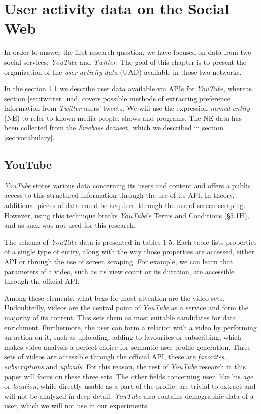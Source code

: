 \section{User activity data on the Social Web} 
\label{sec:uad}
In order to answer the first research question, we have focused on data from two social services: \textit{YouTube} and
\textit{Twitter}. The goal of this chapter is to present the organization of the \textit{user activity data} (UAD)
available in those two networks.

In the section \ref{sec:youtube_uad} we describe user data available via APIs for
\textit{YouTube}, whereas section \ref{sec:twitter_uad} covers possible methods of extracting preference information
from \textit{Twitter} users' tweets. We will use the expression \textit{named entity} (NE) to refer to
known media people, shows and programs. The NE data has been collected from the \textit{Freebase} dataset,
which we described in section \ref{sec:vocabulary}.

\subsection{YouTube}
\label{sec:youtube_uad}

\textit{YouTube} stores various data concerning its users and content and offers a public
access to this structured information through the use of its API. In theory, additional
pieces of data could be acquired through the use of screen scraping. However, using this
technique breaks \textit{YouTube}'s Terms and Conditions (\S 5.1H), and as such
was not used for this research.

The schema of \textit{YouTube} data is presented in tables 1-5.  Each table lists
properties of a single type of entity, along with the way those properties are
accessed, \ie either API or through the use of screen scraping. For example,
we can learn that parameters of a video, such as its view count or
its duration, are accessible through the official API.

Among these elements, what begs for most attention are the video sets.
Undoubtedly, videos are the central point of \textit{YouTube} as a service and form the
majority of its content. This sets them as most suitable candidates for data
enrichment. Furthermore, the user can form a relation with a video by performing
an action on it, such as uploading, adding to favourites or subscribing, which makes
video analysis a perfect choice for semantic user profile generation.  Three
sets of videos are accessible through the official API, these are
\emph{favorites}, \emph{subscriptions} and \emph{uploads}. For this reason, the
rest of \textit{YouTube} research in this paper will focus on these three sets. The other
fields concerning user, like his \textit{age} or \textit{location}, while
directly usable as a part of the profile, are trivial to extract and
will not be analyzed in deep detail. \textit{YouTube} also contains demographic data
of a user, which we will not use in our experiments.

